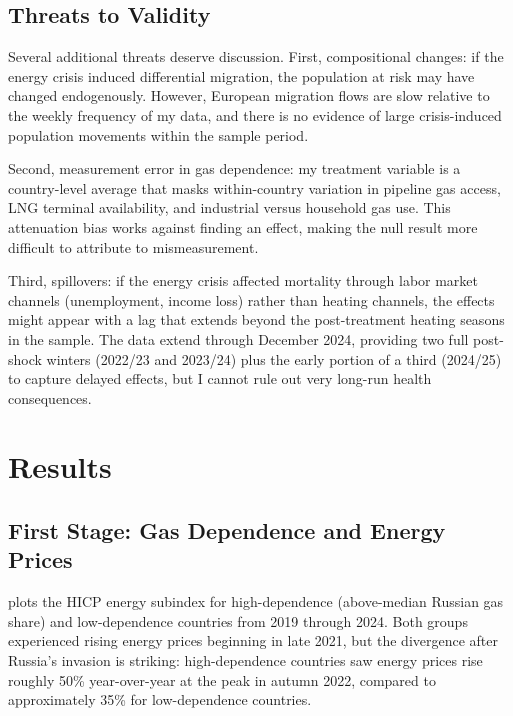 \documentclass[12pt]{article}
\begin{document}
\subsection{Threats to Validity}

Several additional threats deserve discussion. First, compositional changes: if the energy crisis induced differential migration, the population at risk may have changed endogenously. However, European migration flows are slow relative to the weekly frequency of my data, and there is no evidence of large crisis-induced population movements within the sample period.

Second, measurement error in gas dependence: my treatment variable is a country-level average that masks within-country variation in pipeline gas access, LNG terminal availability, and industrial versus household gas use. This attenuation bias works against finding an effect, making the null result more difficult to attribute to mismeasurement.

Third, spillovers: if the energy crisis affected mortality through labor market channels (unemployment, income loss) rather than heating channels, the effects might appear with a lag that extends beyond the post-treatment heating seasons in the sample. The data extend through December 2024, providing two full post-shock winters (2022/23 and 2023/24) plus the early portion of a third (2024/25) to capture delayed effects, but I cannot rule out very long-run health consequences.


\section{Results}
\label{sec:results}

\subsection{First Stage: Gas Dependence and Energy Prices}

 plots the HICP energy subindex for high-dependence (above-median Russian gas share) and low-dependence countries from 2019 through 2024. Both groups experienced rising energy prices beginning in late 2021, but the divergence after Russia's invasion is striking: high-dependence countries saw energy prices rise roughly 50\% year-over-year at the peak in autumn 2022, compared to approximately 35\% for low-dependence countries.
\end{document}
